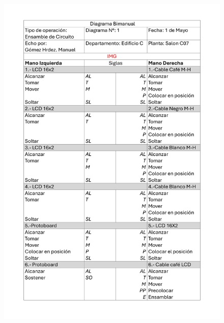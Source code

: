         \begin{figure}[H]
        \centering
        \includegraphics[scale=0.15]{15/img/diagramaBimanualEnsamble.pdf}

\end{figure}
